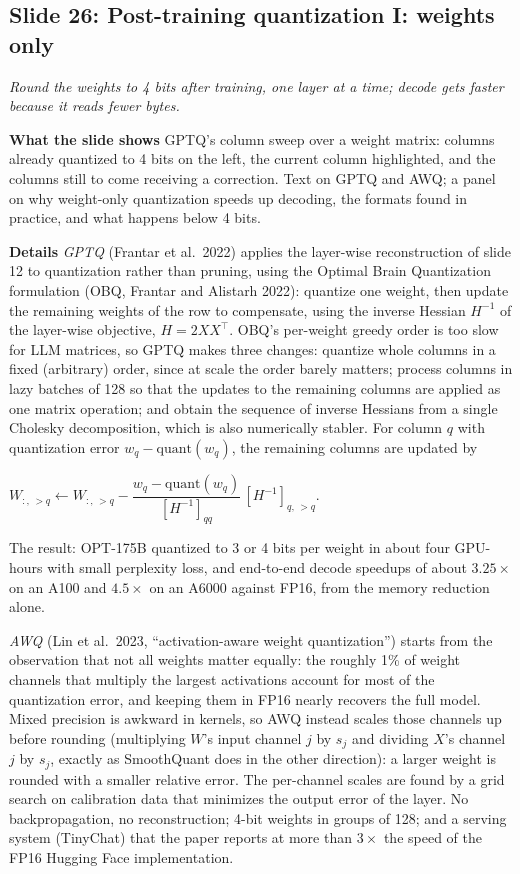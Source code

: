 \documentclass[11pt,letterpaper]{article}
\newcommand{\slide}[3]{%
  \subsection[Slide #1: #2]{Slide #1: #2}%
  {\color{muted}\itshape #3\par}\medskip}
\newcommand{\para}[1]{\medskip\noindent\textbf{#1}\quad}
\newenvironment{formulas}{\begin{tcolorbox}[formulabox]}{\end{tcolorbox}}
\begin{document}
\slide{26}{Post-training quantization I: weights only}{Round the weights to 4 bits after training, one layer at a time; decode gets faster because it reads fewer bytes.}

\para{What the slide shows} GPTQ's column sweep over a weight matrix: columns already quantized to 4 bits on the left, the current column highlighted, and the columns still to come receiving a correction. Text on GPTQ and AWQ; a panel on why weight-only quantization speeds up decoding, the formats found in practice, and what happens below 4 bits.

\para{Details} \emph{GPTQ} (Frantar et al.\ 2022) applies the layer-wise reconstruction of slide 12 to quantization rather than pruning, using the Optimal Brain Quantization formulation (OBQ, Frantar and Alistarh 2022): quantize one weight, then update the remaining weights of the row to compensate, using the inverse Hessian $H^{-1}$ of the layer-wise objective, $H=2XX^\top$. OBQ's per-weight greedy order is too slow for LLM matrices, so GPTQ makes three changes: quantize whole columns in a fixed (arbitrary) order, since at scale the order barely matters; process columns in lazy batches of 128 so that the updates to the remaining columns are applied as one matrix operation; and obtain the sequence of inverse Hessians from a single Cholesky decomposition, which is also numerically stabler. For column $q$ with quantization error $w_q-\mathrm{quant}(w_q)$, the remaining columns are updated by
\begin{formulas}
$W_{:,\,>q}\leftarrow W_{:,\,>q}-\dfrac{w_q-\mathrm{quant}(w_q)}{[H^{-1}]_{qq}}\,[H^{-1}]_{q,\,>q}$.
\end{formulas}
The result: OPT-175B quantized to 3 or 4 bits per weight in about four GPU-hours with small perplexity loss, and end-to-end decode speedups of about $3.25\times$ on an A100 and $4.5\times$ on an A6000 against FP16, from the memory reduction alone.

\emph{AWQ} (Lin et al.\ 2023, ``activation-aware weight quantization'') starts from the observation that not all weights matter equally: the roughly 1\% of weight channels that multiply the largest activations account for most of the quantization error, and keeping them in FP16 nearly recovers the full model. Mixed precision is awkward in kernels, so AWQ instead scales those channels up before rounding (multiplying $W$'s input channel $j$ by $s_j$ and dividing $X$'s channel $j$ by $s_j$, exactly as SmoothQuant does in the other direction): a larger weight is rounded with a smaller relative error. The per-channel scales are found by a grid search on calibration data that minimizes the output error of the layer. No backpropagation, no reconstruction; 4-bit weights in groups of 128; and a serving system (TinyChat) that the paper reports at more than $3\times$ the speed of the FP16 Hugging Face implementation.
\end{document}
